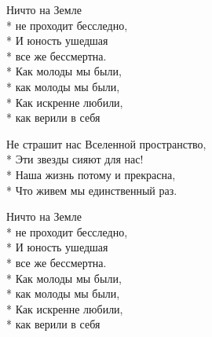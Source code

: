 \begin{minipage}{\linewidth}
\hspace*{1.5em}Ничто на Земле\\*
\hspace*{1.5em}не проходит бесследно,\\*
\hspace*{1.5em}И юность ушедшая\\*
\hspace*{1.5em}все же бессмертна.\\*
\hspace*{1.5em}Как молоды мы были,\\*
\hspace*{1.5em}как молоды мы были,\\*
\hspace*{1.5em}Как искренне любили,\\*
\hspace*{1.5em}как верили в себя\\
\end{minipage}\par\medskip\nobreak

\medskip

\begin{minipage}{\linewidth}
Не страшит нас Вселенной пространство,\\*
Эти звезды сияют для нас!\\*
Наша жизнь потому и прекрасна,\\*
Что живем мы единственный раз.\\
\end{minipage}\par\medskip\nobreak

\medskip

\begin{minipage}{\linewidth}
\hspace*{1.5em}Ничто на Земле\\*
\hspace*{1.5em}не проходит бесследно,\\*
\hspace*{1.5em}И юность ушедшая\\*
\hspace*{1.5em}все же бессмертна.\\*
\hspace*{1.5em}Как молоды мы были,\\*
\hspace*{1.5em}как молоды мы были,\\*
\hspace*{1.5em}Как искренне любили,\\*
\hspace*{1.5em}как верили в себя\\
\end{minipage}\par\medskip\nobreak

